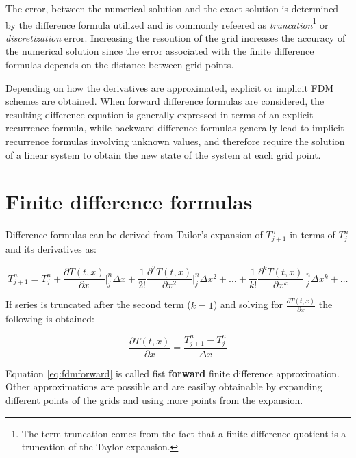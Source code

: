     The error, between the numerical solution and the exact solution is determined by the difference formula utilized and is commonly refeered as \textit{truncation}\footnote{The term truncation comes from the fact that a finite difference quotient is a truncation of the Taylor expansion.} or \textit{discretization} error.  Increasing the resoution of the grid increases the accuracy of the numerical solution since the error associated with the finite difference formulas depends on the distance between grid points.
    
        
    Depending on how the derivatives are approximated, explicit or implicit FDM schemes are
    obtained. When forward difference formulas are considered, the
    resulting difference equation is generally expressed in terms of
    an explicit recurrence formula, while backward difference formulas
    generally lead to implicit recurrence formulas involving unknown
    values, and therefore require the solution of a linear system to
    obtain the new state of the system at each grid point.
    
    
    \section{Finite difference formulas}


    
    Difference formulas can be derived from Tailor's expansion of $T^n_{j+1}$ in terms of $T^n_{j}$ and its derivatives as:
    
    \begin{equation}
    T^n_{j+1} = T^n_{j} +
    \frac{\partial T(t,x)}{\partial x}\bigg\rvert^n_j \Delta x +
    \frac{1}{2!}  \frac{\partial^2 T(t,x)}{\partial x^2}\bigg\rvert^n_j \Delta x^2 + \ldots + 
     \frac{1}{k!}  \frac{\partial^k T(t,x)}{\partial x^k}\bigg\rvert^n_j \Delta x^k + \ldots
     \label{eq:taylorexp1}
    \end{equation}
    
    If series is truncated after the second term ($k=1$) and solving for $\frac{\partial T(t,x)}{\partial x}$ the following is obtained:
    
    \begin{equation}
    \frac{\partial T(t,x)}{\partial x}  = \frac{T^n_{j+1} - T^n_{j}}{\Delta x}
    \label{eq:fdmforward}
    \end{equation}
    
    Equation \ref{eq:fdmforward} is called fist \textbf{forward} finite difference approximation. Other approximations are possible and are easilby obtainable by expanding different points of the grids and using more points from the expansion.
    
